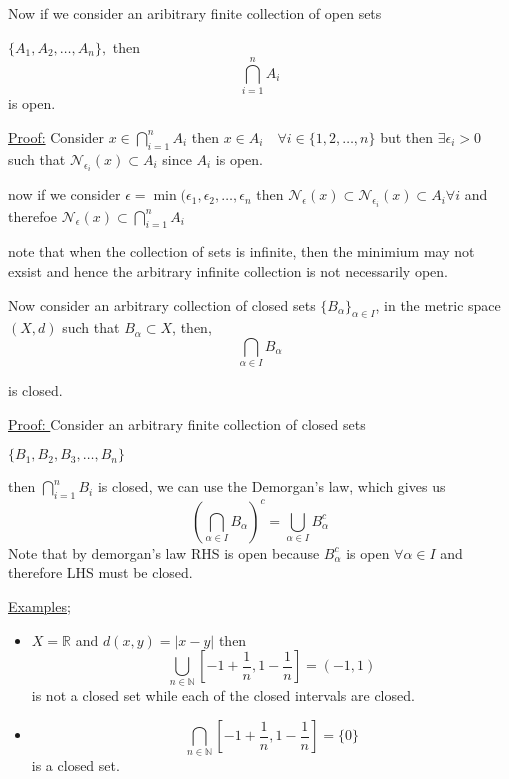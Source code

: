 \documentclass[12pt,a4paper]{article}
\begin{document}
  Now if we consider an aribitrary finite collection of open sets 
  
  \(\{A_{1},A_{2},\ldots,A_{n}\},\) then \[ \bigcap_{i=1}^n A_{i}\] is open.  

  \underline{Proof:} Consider \( x \in \bigcap_{i=1}^n A_{i}\) then \(x \in A_{i} \quad \forall i \in \{1,2,\ldots,n\} \) but then \(\exists \epsilon_{i} >0 \)  such that \(\mathcal{N}_{\epsilon_{i}}(x) \subset A_{i}\) since \(A_{i}\) is open.
  
  now if we consider \(\epsilon = \min(\epsilon_{1},\epsilon_{2},\ldots, \epsilon_{n}\) then \(\mathcal{N}_{\epsilon}(x) \subset \mathcal{N}_{\epsilon_{i}}(x) \subset A_{i} \forall i \) and therefoe \(\mathcal{N}_{\epsilon}(x) \subset \bigcap_{i=1}^n A_{i}\) 
  
  note that when the collection of sets is infinite, then the minimium may not exsist and hence the arbitrary infinite collection is not necessarily open. 

  Now consider an arbitrary collection of closed sets \( \{ B_{\alpha} \}_{\alpha \in I}\), in the metric space \(\left( X,d \right) \) such that \(B_{\alpha} \subset X\),
  then,
  \begin{equation*}
      \bigcap_{\alpha \in I} B_{\alpha}
  \end{equation*}      
  
  is closed.
  
  \underline{ Proof: } Consider an arbitrary finite collection of closed sets 
  
  \(\{B_{1},B_{2},B_{3},\ldots,B_{n}\}\)
  
  then \(\bigcap_{i=1}^n B_{i}\) is closed, we can use the Demorgan's law, which gives us 
  \begin{equation*}
      \left( \bigcap_{\alpha \in I} B_{\alpha} \right)^c = \bigcup_{\alpha \in I} B_{\alpha}^c 
  \end{equation*}  
  Note that by demorgan's law RHS is open because \(B_{\alpha}^c\) is open \(\forall \alpha \in I   \) and therefore LHS must be closed.
  
  \underline{Examples;}
  \begin{itemize}
    \item \(X=\mathbb{R}\) and \(d(x,y)=|x-y|\) then \[\bigcup_{n \in \mathbb{N}}[-1+\frac{1}{n}, 1 -\frac{1}{n}] = (-1,1)\] is not a closed set while each of the closed intervals are closed. 
    \item \[\bigcap_{n \in \mathbb{N}}[-1+\frac{1}{n}, 1 -\frac{1}{n}] = \{0\}\]  is a closed set.   
  \end{itemize}
 
\end{document}
